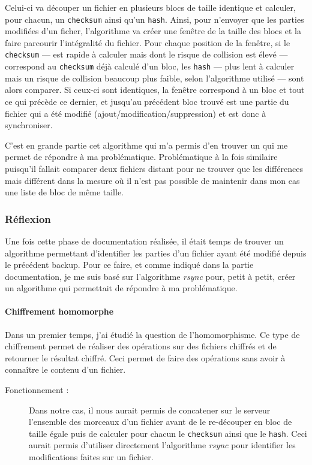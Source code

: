 \documentclass[a4paper,10pt, twoside]{report}
\begin{document}
\begin{spacing}{1.2}
Celui-ci va d\'ecouper un fichier en plusieurs blocs de taille identique et
calculer, pour chacun, un \texttt{checksum} ainsi qu'un \texttt{hash}. Ainsi,
pour n'envoyer que les parties modifi\'ees d'un ficher, l'algorithme va cr\'eer
une fen\^etre de la taille des blocs et la faire parcourir l'int\'egralit\'e du
fichier. Pour chaque position de la fen\^etre, si le \texttt{checksum} --- est
rapide \`a calculer mais dont le risque de collision est \'elev\'e ---
correspond au \texttt{checksum} d\'ej\`a calcul\'e d'un bloc, les \texttt{hash}
--- plus lent \`a calculer mais un risque de collision beaucoup plus faible, 
selon l'algorithme utilis\'e --- sont alors comparer. Si ceux-ci sont
identiques, la fen\^etre correspond \`a un bloc et tout ce qui pr\'ec\`ede ce
dernier, et jusqu'au pr\'ec\'edent bloc trouv\'e est une partie du fichier qui
a \'et\'e modifi\'e (ajout/modification/suppression) et est donc \`a
synchroniser.

C'est en grande partie cet algorithme qui m'a permis d'en trouver un qui me
permet de r\'epondre \`a ma probl\'ematique. Probl\'ematique \`a la fois
similaire puisqu'il fallait comparer deux fichiers distant pour ne trouver que
les diff\'erences mais diff\'erent dans la mesure o\`u il n'est pas possible
de maintenir dans mon cas une liste de bloc de m\^eme taille.

\subsubsection{R\'eflexion}
Une fois cette phase de documentation r\'ealis\'ee, il \'etait temps de trouver
un algorithme permettant d'identifier les parties d'un fichier ayant \'et\'e
modifi\'e depuis le pr\'ec\'edent backup. Pour ce faire, et comme indiqu\'e
dans la partie documentation, je me suis bas\'e sur l'algorithme \textit{rsync}
pour, petit \`a petit, cr\'eer un algorithme qui permettait de r\'epondre \`a ma
probl\'ematique.

\paragraph{Chiffrement homomorphe\\}
Dans un premier temps, j'ai \'etudi\'e la question de l'homomorphisme. Ce type
de chiffrement permet de r\'ealiser des op\'erations sur des fichiers chiffr\'es
et de retourner le r\'esultat chiffr\'e. Ceci permet de faire des op\'erations
sans avoir \`a conna\^itre le contenu d'un fichier.

\begin{description}
 \item [Fonctionnement :] Dans notre cas, il nous aurait permis de concatener
 sur le serveur l'ensemble des morceaux d'un fichier avant de le re-d\'ecouper
 en bloc de taille \'egale puis de calculer pour chacun le \texttt{checksum}
 ainsi que le \texttt{hash}. Ceci aurait permis d'utiliser directement
 l'algorithme \textit{rsync} pour identifier les modifications faites sur un
 fichier.


\end{description}
\end{spacing}
\end{document}
